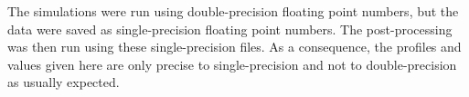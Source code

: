 The simulations were run using double-precision floating point numbers, but the
data were saved as single-precision floating point numbers.  The
post-processing was then run using these single-precision files.  As a
consequence, the profiles and values given here are only precise to
single-precision and not to double-precision as usually expected.
